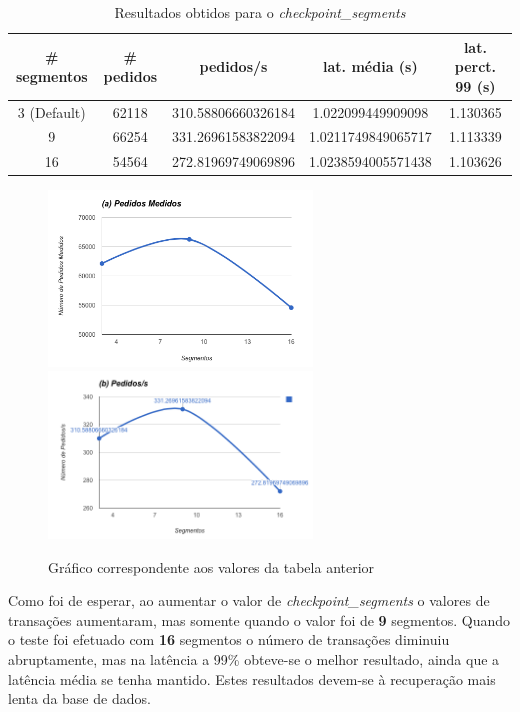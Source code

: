 \begin{table}[!h]
\center
\small
\begin{tabular}{|c|c|c|c|c|}
\hline
\textbf{\# segmentos} & \textbf{\# pedidos} & \textbf{pedidos/s} & \textbf{lat. média (s)} & \textbf{lat. perct. 99 (s)}  \\ \hline
3 (Default) & 62118 & 310.58806660326184 & 1.022099449909098 & 1.130365  \\ \hline
9 & 66254 & 331.26961583822094 & 1.0211749849065717 & 1.113339  \\ \hline
16 & 54564 & 272.81969749069896 & 1.0238594005571438 & 1.103626  \\ \hline
\end{tabular}
\caption{Resultados obtidos para o \textit{checkpoint\_segments}}
\end{table}

\begin{figure}[ht!]
\centering
\includegraphics[width=70mm]{img/03_cs_a.png}
\includegraphics[width=70mm]{img/03_cs_b.png}
\caption{Gráfico correspondente aos valores da tabela anterior\label{overflow}}
\end{figure}

Como foi de esperar, ao aumentar o valor de \textit{checkpoint\_segments} o valores de transações aumentaram, mas somente quando o valor foi de \textbf{9} segmentos. Quando o teste foi efetuado com \textbf{16} segmentos o número de transações diminuiu abruptamente, mas na latência a 99\% obteve-se o melhor resultado, ainda que a latência média se tenha mantido. Estes resultados devem-se à recuperação mais lenta da base de dados.


